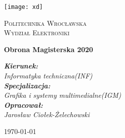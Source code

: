 \begin{titlepage}
	\centering
	\texttt{[image: xd]}\par\vspace{1cm}
	{\scshape\LARGE Politechnika Wrocławska\\ Wydział Elektroniki \par}
	\vspace{2.5cm}
	{\huge\bfseries Obrona Magisterska 2020\par}
	\vspace{2cm}
	{\Large\itshape 
		\textbf{Kierunek:}\\Informatyka techniczna(INF)\\
		\textbf{Specjalizacja:}\\Grafika i systemy multimedialne(IGM)\\
		\textbf{Opracował:}\\Jarosław Ciołek-Żelechowski
		\par}
	
	
	\vfill
	
	{\large \today\par}
\end{titlepage}